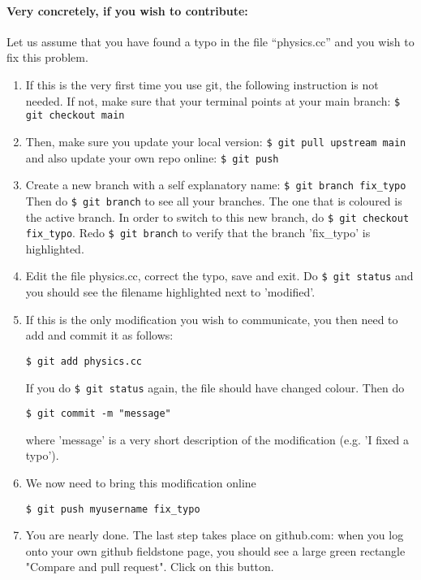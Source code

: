 \paragraph{Very concretely, if you wish to contribute:} 

Let us assume that you have found a typo in the file ``physics.cc'' and you wish to 
fix this problem. 

\begin{enumerate}
\item
If this is the very first time you use git, the following instruction is not needed. If not, 
make sure that your terminal points at your main branch:
\verb"$ git checkout main"

\item
Then, make sure you update your local version:
\verb"$ git pull upstream main" 
and also update your own repo online:
\verb"$ git push"

\item
Create a new branch with a self explanatory name:
\verb"$ git branch fix_typo"
Then do \verb"$ git branch" to see all your branches. The one that is coloured is 
the active branch. In order to switch to this new branch, do 
\verb"$ git checkout fix_typo". Redo \verb"$ git branch" to verify that 
the branch 'fix\_typo' is highlighted.

\item
Edit the file physics.cc, correct the typo, save and exit. 
Do \verb"$ git status" and you should see the filename highlighted next to 'modified'. 

\item If this is the only modification you wish to communicate, you then need to add and commit 
it as follows:
\begin{verbatim}
$ git add physics.cc
\end{verbatim}
If you do \verb'$ git status' again, the file should have changed colour. 
Then do
\begin{verbatim}
$ git commit -m "message"
\end{verbatim}
where 'message' is a very short description of the modification (e.g. 'I fixed a typo').

\item We now need to bring this modification online 
\begin{verbatim}
$ git push myusername fix_typo
\end{verbatim}

\item You are nearly done. The last step takes place on github.com: when you log onto 
your own github fieldstone page, you should see a large green rectangle "Compare and pull request".
Click on this button.


\end{enumerate}
